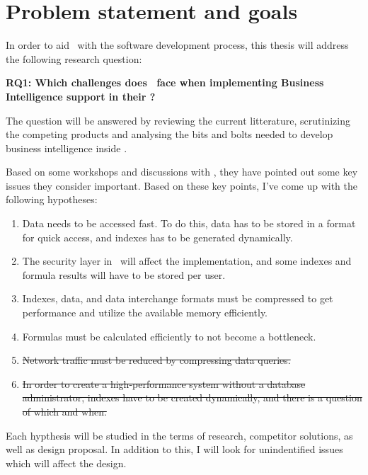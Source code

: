 \section{Problem statement and goals}
\label{sec:problem-statement-and-goals}
In order to aid \genus~with the software development process, this thesis will address the following research question:

\textbf{RQ1: Which challenges does \genus~face when implementing Business Intelligence support in their \genusSoftware?}

The question will be answered by reviewing the current litterature, scrutinizing the competing products and analysing the bits and bolts needed to develop business intelligence inside \genusSoftware.

Based on some workshops and discussions with \genus , they have pointed out some key issues they consider important. Based on these key points, I've come up with the following hypotheses:
\begin{enumerate}\bfseries
  \item Data needs to be accessed fast. To do this, data has to be stored in a format for quick access, and indexes has to be generated dynamically.
  \item The security layer in \genusSoftware~will affect the implementation, and some indexes and formula results will have to be stored per user.
  \item Indexes, data, and data interchange formats must be compressed to get performance and utilize the available memory efficiently.
  \item Formulas must be calculated efficiently to not become a bottleneck.
  \item \sout{Network traffic must be reduced by compressing data queries.}
  \item \sout{In order to create a high-performance system without a database administrator, indexes have to be created dynamically, and there is a question of which and when.}
\end{enumerate}

Each hypthesis will be studied in the terms of research, competitor solutions, as well as design proposal. In addition to this, I will look for unindentified issues which will affect the design.


